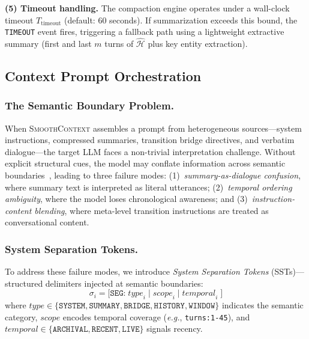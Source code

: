 \documentclass[10pt,twocolumn]{article}
\newcommand{\sys}{\textsc{SmoothContext}}
\newcommand{\eg}{\textit{e.g.}}
\begin{document}
\textbf{(5) Timeout handling.} The compaction engine operates under a wall-clock timeout $T_{\mathrm{timeout}}$ (default: 60 seconds). If summarization exceeds this bound, the \texttt{TIMEOUT} event fires, triggering a fallback path using a lightweight extractive summary (first and last $m$ turns of $\hat{\mathcal{H}}$ plus key entity extraction).

\subsection{Context Prompt Orchestration}\label{sec:prompt}

\subsubsection{The Semantic Boundary Problem.}

When \sys{} assembles a prompt from heterogeneous sources---system instructions, compressed summaries, transition bridge directives, and verbatim dialogue---the target LLM faces a non-trivial interpretation challenge. Without explicit structural cues, the model may conflate information across semantic boundaries~\cite{shi2023large}, leading to three failure modes: (1)~\emph{summary-as-dialogue confusion}, where summary text is interpreted as literal utterances; (2)~\emph{temporal ordering ambiguity}, where the model loses chronological awareness; and (3)~\emph{instruction-content blending}, where meta-level transition instructions are treated as conversational content.

\subsubsection{System Separation Tokens.}

To address these failure modes, we introduce \emph{System Separation Tokens} (SSTs)---structured delimiters injected at semantic boundaries:
\begin{equation}\label{eq:sst}
  \sigma_i = \texttt{[SEG:}\;\mathit{type}_i\;\texttt{|}\;\mathit{scope}_i\;\texttt{|}\;\mathit{temporal}_i\;\texttt{]}
\end{equation}
where $\mathit{type} \in \{\texttt{SYSTEM}, \texttt{SUMMARY}, \texttt{BRIDGE}, \texttt{HISTORY}, \texttt{WINDOW}\}$ indicates the semantic category, $\mathit{scope}$ encodes temporal coverage (\eg, \texttt{turns:1-45}), and $\mathit{temporal} \in \{\texttt{ARCHIVAL}, \texttt{RECENT}, \texttt{LIVE}\}$ signals recency.
\end{document}
